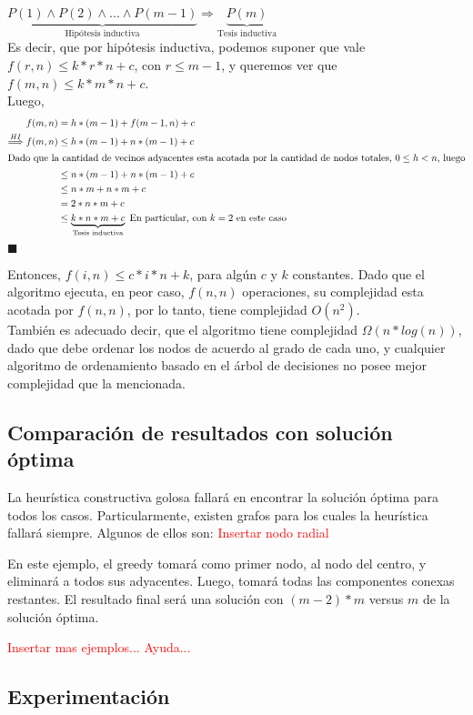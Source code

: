 $\underbrace{P(1) \wedge P(2) \wedge ... \wedge P(m-1)}_{\text{Hipótesis inductiva}} \Rightarrow \underbrace{P(m)}_{\text{Tesis inductiva}}$\\

Es decir, que por hipótesis inductiva, podemos suponer que vale $f(r,n) \leq k*r*n + c$, con $r \leq m-1$, y queremos ver que $f(m,n) \leq k*m*n + c$.\\
Luego,
\begin{align*}
f(m,n) & = h*(m-1) + f(m-1,n) + c \\
 \stackrel{HI}{\Longrightarrow} f(m,n) & \leq h*(m-1) + n*(m-1) + c \\
 \intertext{Dado que la cantidad de vecinos adyacentes esta acotada por la cantidad de nodos totales, $0 \leq h < n$, luego}
 & \leq n*(m-1)+n*(m-1) + c\\
 & \leq n*m + n*m + c\\
 & = 2*n*m + c\\
 & \leq \underbrace{k*n*m + c}_{\text{Tesis inductiva}} \text{       En particular, con $k = 2$ en este caso}
\end{align*}
\hfill $\blacksquare$

Entonces, $f(i,n) \leq c*i*n + k$, para algún $c$ y $k$ constantes.
Dado que el algoritmo ejecuta, en peor caso, $f(n,n)$ operaciones, su complejidad esta acotada por $f(n,n)$, por lo tanto, tiene complejidad $O(n^{2})$.\\

También es adecuado decir, que el algoritmo tiene complejidad $\Omega(n*log(n))$, dado que debe ordenar los nodos de acuerdo al grado de cada uno, y cualquier algoritmo de ordenamiento basado en el árbol de decisiones no posee mejor complejidad que la mencionada.

\subsection{Comparaci\'on de resultados con soluci\'on \'optima}
La heurística constructiva golosa fallará en encontrar la solución óptima para todos los casos.
Particularmente, existen grafos para los cuales la heurística fallará siempre.
Algunos de ellos son:
\textcolor{red}{Insertar nodo radial}

En este ejemplo, el greedy tomará como primer nodo, al nodo del centro, y eliminará a todos sus adyacentes. Luego, tomará todas las componentes conexas restantes.
El resultado final será una solución con $(m-2)*m$ versus $m$ de la solución óptima.

\textcolor{red}{Insertar mas ejemplos... Ayuda...}

\subsection{Experimentaci\'on}
